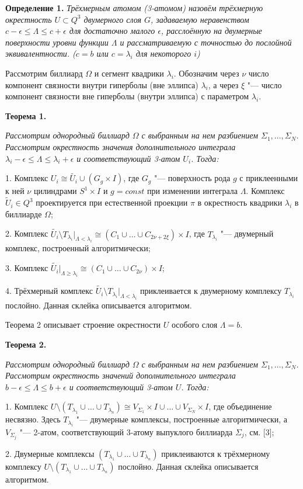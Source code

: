 \textbf{Определение 1.} { \it Трёхмерным атомом (3-атомом) назо\-вём трёхмерную окрестность $U \subset Q^3$ двумерного слоя $G$, зада\-ваемую неравенством $c - \epsilon \leq \Lambda \leq c + \epsilon$ для достаточно малого $\epsilon$, расслоённую на двумерные поверхности уровни функции $\Lambda$ и рассматриваемую с точностью до послойной экви\-вален\-тности. ($c = b$ или $c = \lambda_i$ для некоторого $i$)}

Рассмотрим биллиард $\Omega$ и сегмент квадрики $\lambda_i$. Обоз\-начим через $\nu$ число компонент связности внутри гиперболы (вне эллипса) $\lambda_i$, а через $\xi$ "--- число компонент связности вне гиперболы (внутри эллипса) с параметром $\lambda_i$.

\textbf{Теорема 1.}
	{\it Рассмотрим однородный биллиард $\Omega$ с выб\-ран\-ным на нем разбиением $\Sigma_1, \ldots, \Sigma_N$. Рассмотрим окрест\-ность значения дополнительного интеграла $\lambda_i - \epsilon \leq \Lambda \leq \lambda_i + \epsilon$ и соответствующий 3-атом $U_i$. Тогда:

	1. Комплекс $U_i \cong \tilde{U_i} \cup (G_g \times I)$, где $G_g$ "--- поверхность рода $g$ с приклеенными к ней $\nu$ цилиндрами $S^1 \times I$ и $g = const$ при изменении интеграла $\Lambda$. Комплекс $\tilde U_i \in Q^3$ проектируется при естественной проекции $\pi$ в окрестность квадрики $\lambda_i$ в биллиарде $\Omega$;

	2. Комплекс $\tilde{U_i} \setminus T_{\lambda_i} |_{\Lambda < \lambda_i} \cong (C_1 \cup \ldots \cup C_{2\nu+2\xi}) \times I$, где $T_{\lambda_i} $ "--- двумерный комплекс, построенный алгорит\-мически;

	3. Комплекс $\tilde{U_i} |_{\Lambda \geq \lambda_i} \cong (C_1 \cup \ldots \cup C_{2\nu}) \times I$;

	4. Трёхмерный комплекс $\tilde{U_i} \setminus T_{\lambda_i} |_{\Lambda < \lambda_i}$ прик\-леи\-вается к двумерному комплексу $T_{\lambda_i}$ послойно. Данная склей\-ка описы\-вается алгоритмом.
}

Теорема 2 описывает строение окрестности $U$ особого слоя $\Lambda = b$.

\textbf{Теорема 2.} {\it
	Рассмотрим однородный биллиард $\Omega$ с выб\-ран\-ным на нем разбиением $\Sigma_1, \ldots, \Sigma_N$. Рассмотрим окрест\-ность значений дополнительного интеграла $b - \epsilon \leq \Lambda \leq b + \epsilon$ и соответствующий 3-атом $U$. Тогда:

1. Комплекс $U \setminus (T_{\lambda_1}\cup\ldots\cup T_{\lambda_n}) \cong V_{\Sigma_1} \times I \cup \ldots \cup V_{\Sigma_N} \times I$, где объединение несвязно. Здесь $T_{\lambda_i}$ "--- двумерные комплексы, построенные алгорит\-мически, а $V_{\Sigma_j}$ "--- 2-атом, соот\-вет\-ствующий 3-атому выпуклого бил\-лиарда $\Sigma_j$, см. [3];

2. Двумерные комплексы $(T_{\lambda_1} \cup \ldots \cup T_{\lambda_n})$ приклеиваются к трёхмерному комплексу $U \setminus (T_{\lambda_1} \cup \ldots \cup T_{\lambda_n})$ послойно. Данная склейка описывается алгоритмом.}







